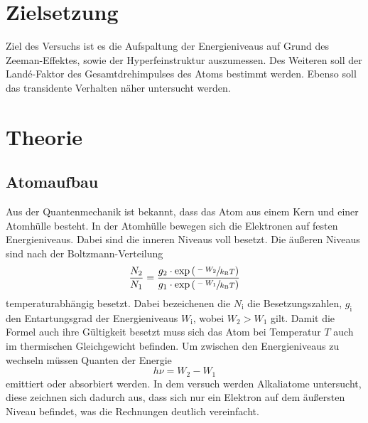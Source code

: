 \section{Zielsetzung}
\label{sec:Zielsetzung}
Ziel des Versuchs ist es die Aufspaltung der Energieniveaus auf Grund des Zeeman-Effektes,
sowie der Hyperfeinstruktur auszumessen. Des Weiteren soll der Landé-Faktor des Gesamtdrehimpulses
des Atoms bestimmt werden. Ebenso soll das transidente Verhalten näher untersucht werden.

\section{Theorie}
\label{sec:Theorie}
\subsection{Atomaufbau}
\label{sec:atomaufbau}
Aus der Quantenmechanik ist bekannt, dass das Atom aus einem Kern und einer Atomhülle besteht.
In der Atomhülle bewegen sich die Elektronen auf festen Energieniveaus. Dabei sind die inneren
Niveaus voll besetzt. Die äußeren Niveaus sind nach der Boltzmann-Verteilung
\begin{equation}
  \label{eqn:boltz}
  \frac{N_2}{N_1} = \frac{g_2 \cdot \exp{\left(\sfrac{-W_2}{k_\text{B}T}\right)}}{g_1 \cdot \exp{\left(\sfrac{-W_1}{k_\text{B}T}\right)}}
\end{equation}
tem­pe­ra­tur­ab­hän­gig besetzt. Dabei bezeichenen die $N_\text{i}$ die Besetzungszahlen, $g_\text{i}$ den Entartungsgrad
der Energieniveaus $W_\text{i}$, wobei $W_2 > W_1$ gilt. Damit die Formel auch ihre Gültigkeit besetzt
muss sich das Atom bei Temperatur $T$ auch im thermischen Gleichgewicht befinden.
Um zwischen den Energieniveaus zu wechseln müssen Quanten der Energie
\begin{equation}
  \label{eqn:energiedifferenz}
  h \nu = W_2 - W_1
\end{equation}
emittiert oder absorbiert werden. 
In dem versuch werden Alkaliatome untersucht, diese zeichnen sich dadurch aus, dass sich nur ein 
Elektron auf dem äußersten Niveau befindet, was die Rechnungen deutlich vereinfacht.

